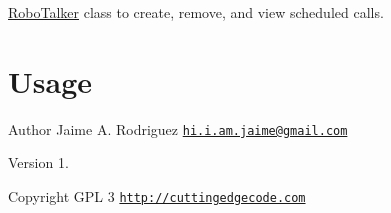\hyperlink{class_robo_talker}{Robo\-Talker} class to create, remove, and view scheduled calls.\hypertarget{template1_usage}{}\section{Usage}\label{template1_usage}



\begin{DoxyAuthor}{Author}
Jaime A. Rodriguez \href{mailto:hi.i.am.jaime@gmail.com}{\tt hi.\-i.\-am.\-jaime@gmail.\-com} 
\end{DoxyAuthor}
\begin{DoxyVersion}{Version}
1. 
\end{DoxyVersion}
\begin{DoxyCopyright}{Copyright}
G\-P\-L 3 \href{http://cuttingedgecode.com}{\tt http\-://cuttingedgecode.\-com} 
\end{DoxyCopyright}

